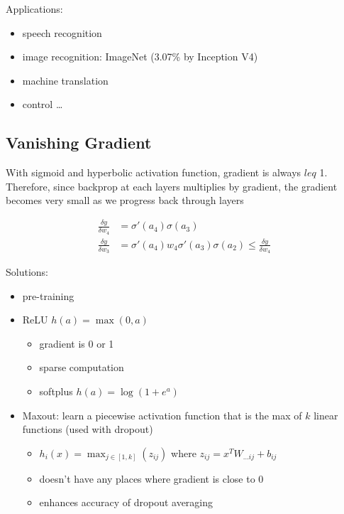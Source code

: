 \documentclass[]{article}
\theoremstyle{definition}
\begin{document}
Applications:
\begin{itemize}
    \item speech recognition
    \item image recognition: ImageNet (3.07\% by Inception V4)
    \item machine translation
    \item control \ldots
\end{itemize}

\subsection{Vanishing Gradient}
\label{sub:vanishing_gradient}

With sigmoid and hyperbolic activation function, gradient is always $leq$ 1. Therefore, since backprop at each layers multiplies by gradient, the gradient becomes very small as we progress back through layers

\begin{align*}
    \frac{\delta y}{\delta w_4} &= \sigma'(a_4) \sigma(a_3) \\
    \frac{\delta y}{\delta w_3} &= \sigma'(a_4) w_4 \sigma'(a_3) \sigma(a_2) \leq \frac{\delta y}{\delta w_4} 
\end{align*}

Solutions:
\begin{itemize}
    \item pre-training
    \item ReLU $h(a) = \max(0, a)$
        \begin{itemize}
            \item gradient is 0 or 1
            \item sparse computation
            \item softplus $h(a) = \log (1 + e^a)$
        \end{itemize}
    \item Maxout: learn a piecewise activation function that is the max of $k$ linear functions (used with dropout)
        \begin{itemize}
            \item $h_i(x) = \max_{j \in [1, k]} (z_{ij})$ where $z_{ij} = x^T W_{ \ldots ij} + b_{ij}$
            \item doesn't have any places where gradient is close to 0
            \item enhances accuracy of dropout averaging
        \end{itemize}
\end{itemize}
\end{document}
